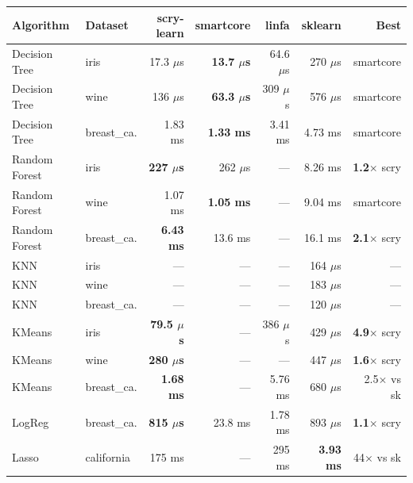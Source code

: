 \documentclass[11pt,a4paper]{article}
\newcommand{\hdr}[1]{\cellcolor{headerblue}\textbf{\color{darktext}#1}}
\newcommand{\win}[1]{\textbf{\color{wingreen}#1}}
\newcommand{\us}{$\mu$s}
\newcommand{\speedup}[1]{{\footnotesize\color{wingreen}\textbf{#1$\times$}}}
\newcommand{\slower}[1]{{\footnotesize\color{losered}#1$\times$}}
\begin{document}
\vspace{4pt}
\begin{table}[H]
\centering
\small
\setlength{\tabcolsep}{4pt}
\renewcommand{\arraystretch}{1.2}
\begin{tabular}{llrrrrr}
\toprule
\rowcolor{headerblue}
\hdr{Algorithm} & \hdr{Dataset} & \hdr{scry-learn} & \hdr{smartcore} & \hdr{linfa} & \hdr{sklearn} & \hdr{Best} \\
\midrule
Decision Tree  & iris           & 17.3 \us       & \win{13.7 \us} & 64.6 \us       & 270 \us        & smartcore \\
\rowcolor{lightgray}
Decision Tree  & wine           & 136 \us        & \win{63.3 \us} & 309 \us        & 576 \us        & smartcore \\
Decision Tree  & breast\_ca.    & 1.83 ms        & \win{1.33 ms}  & 3.41 ms        & 4.73 ms        & smartcore \\
\midrule
Random Forest  & iris           & \win{227 \us}  & 262 \us        & ---            & 8.26 ms        & \speedup{1.2} scry \\
\rowcolor{lightgray}
Random Forest  & wine           & 1.07 ms        & \win{1.05 ms}  & ---            & 9.04 ms        & smartcore \\
Random Forest  & breast\_ca.    & \win{6.43 ms}  & 13.6 ms        & ---            & 16.1 ms        & \speedup{2.1} scry \\
\midrule
KNN            & iris           & ---            & ---            & ---            & 164 \us        & --- \\
\rowcolor{lightgray}
KNN            & wine           & ---            & ---            & ---            & 183 \us        & --- \\
KNN            & breast\_ca.    & ---            & ---            & ---            & 120 \us        & --- \\
\midrule
KMeans         & iris           & \win{79.5 \us} & ---            & 386 \us        & 429 \us        & \speedup{4.9} scry \\
\rowcolor{lightgray}
KMeans         & wine           & \win{280 \us}  & ---            & ---            & 447 \us        & \speedup{1.6} scry \\
KMeans         & breast\_ca.    & \win{1.68 ms}  & ---            & 5.76 ms        & 680 \us        & \slower{2.5} vs sk \\
\midrule
LogReg         & breast\_ca.    & \win{815 \us}  & 23.8 ms        & 1.78 ms        & 893 \us        & \speedup{1.1} scry \\
\rowcolor{lightgray}
Lasso          & california     & 175 ms         & ---            & 295 ms         & \win{3.93 ms}  & \slower{44} vs sk \\
\bottomrule
\end{tabular}
\end{table}
\end{document}
